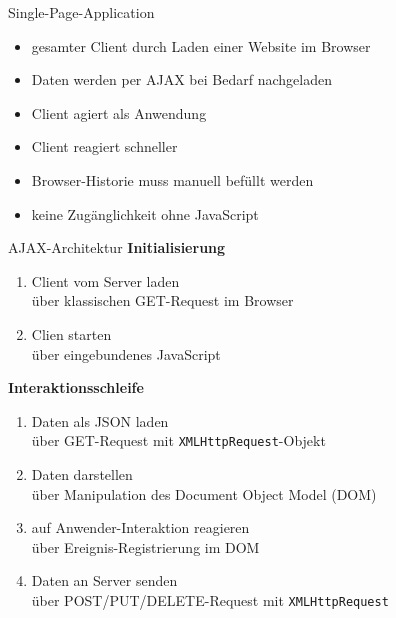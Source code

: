 \begin{frame}{Single-Page-Application}
  \begin{itemize}
    \item gesamter Client durch Laden einer Website im Browser
    \item Daten werden per AJAX bei Bedarf nachgeladen\\[2ex]
    \item[\goodmark] Client agiert als Anwendung
    \item[\goodmark] Client reagiert schneller\\[2ex]
    \item[\badmark] Browser-Historie muss manuell befüllt werden
    \item[\badmark] keine Zugänglichkeit ohne JavaScript
    \end{itemize}
\end{frame}

\begin{frame}{AJAX-Architektur}{}
  {\color{maincolor}\bfseries Initialisierung}
  \begin{enumerate}
    \item Client vom Server laden 
      {\scriptsize\\\color{gray} über klassischen GET-Request im Browser\\[2ex]}
    \item Clien starten 
      {\scriptsize\\\color{gray} über eingebundenes JavaScript\\[2ex]}
  \end{enumerate}    
  
  \vfill
  
  {\color{maincolor}\bfseries Interaktionsschleife}
  \begin{enumerate}
    \item Daten als JSON laden 
      {\scriptsize\\\color{gray} über GET-Request mit \texttt{XMLHttpRequest}-Objekt\\[2ex]}
    \item Daten darstellen 
      {\scriptsize\\\color{gray} über Manipulation des Document Object Model (DOM)\\[2ex]}
    \item auf Anwender-Interaktion reagieren 
      {\scriptsize\\\color{gray} über Ereignis-Registrierung im DOM\\[2ex]}
    \item Daten an Server senden
      {\scriptsize\\\color{gray} über POST/PUT/DELETE-Request mit \texttt{XMLHttpRequest}\\[2ex]}
  \end{enumerate}
\end{frame}

